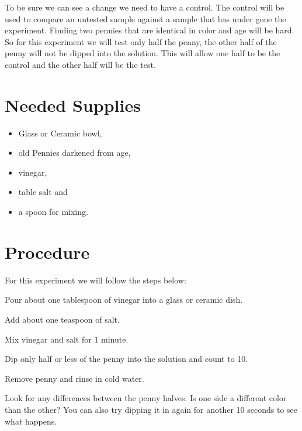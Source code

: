 \documentclass[12pt,twoside,a4]{article}
\begin{document}
To be sure we can see a change we need to have a control.  The control will be used to compare an untested sample against a sample that has under gone the experiment.  Finding two pennies that are identical in color and age will be hard.  So for this experiment we will test only half the penny, the other half of the penny will not be dipped into the solution.  This will allow one half to be the control and the other half will be the test.

\section{Needed Supplies}
\begin{itemize}%
\item Glass or Ceramic bowl,
\item old Pennies darkened from age,
\item vinegar,
\item table salt and
\item a spoon for mixing.
\end{itemize}

\section{Procedure}
For this experiment we will follow the steps below:
\begin{steps}
\setlength\itemindent{25pt}
\item Pour about one tablespoon of vinegar into a glass or ceramic dish.
\item Add about one teaspoon of salt.
\item Mix vinegar and salt for 1 minute.
\item Dip only half or less of the penny into the solution and count to 10.
\item Remove penny and rinse in cold water.
\item Look for any differences between the penny halves.  Is one side a different color than the other?  You can also try dipping it in again for another 10 seconds to see what happens.
\end{steps}
\end{document}
